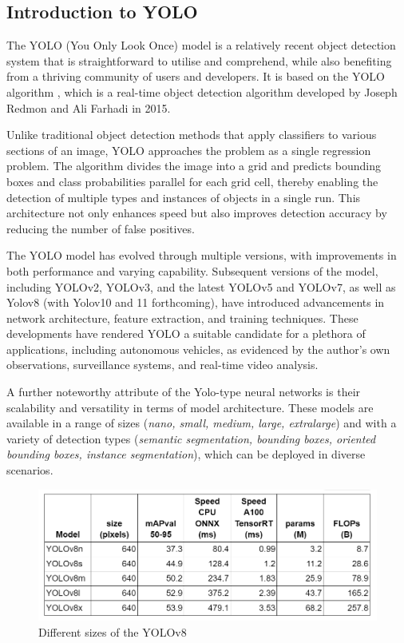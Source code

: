 \subsection{Introduction to YOLO}\label{subsec:introduction-to-yolo}

The YOLO (You Only Look Once) model is a relatively recent object detection system that is straightforward to utilise and comprehend, while also benefiting from a thriving community of users and developers.
It is based on the YOLO algorithm , which is a real-time object detection algorithm developed by Joseph Redmon and Ali Farhadi in 2015\cite{redmon2016lookonceunifiedrealtime}.

Unlike traditional object detection methods that apply classifiers to various sections of an image,
YOLO approaches the problem as a single regression problem.
The algorithm divides the image into a grid and  predicts bounding boxes and class probabilities parallel for each grid cell,
thereby enabling the detection of multiple types and instances of objects in a single run.
This architecture not only enhances speed but also improves detection accuracy by reducing the number of false positives.

The YOLO model has evolved through multiple versions, with improvements in both performance and varying capability.
Subsequent versions of the model, including YOLOv2, YOLOv3, and the latest YOLOv5 and YOLOv7, as well as Yolov8 (with Yolov10 and 11 forthcoming),
have introduced advancements in network architecture,
feature extraction, and training techniques.
These developments have rendered YOLO a suitable candidate for a plethora of applications,
including autonomous vehicles, as evidenced by the author's own observations, surveillance systems, and real-time video analysis.

A further noteworthy attribute of the Yolo-type neural networks is their scalability and versatility in terms of model architecture.
These models are available in a range of sizes (\textit{nano, small, medium, large, extralarge}) and with a variety of detection types (\textit{semantic segmentation, bounding boxes,
oriented bounding boxes, instance segmentation}), which can be deployed in diverse scenarios.




\begin{figure}[ht]
\includegraphics[width=1.0\textwidth]{figures/table1}
\caption{Different sizes of the YOLOv8~\cite{githubGitHubUltralyticsultralytics}}
\label{fig:tableofsizes}
\end{figure}

